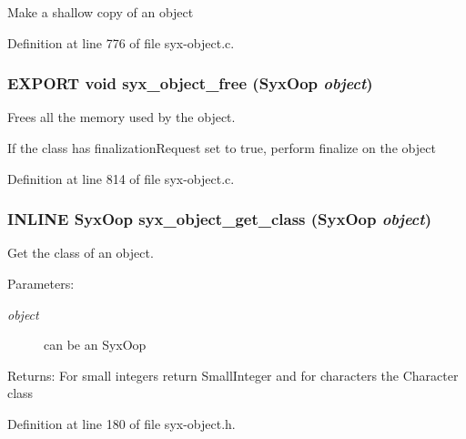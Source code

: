 Make a shallow copy of an object 

Definition at line 776 of file syx-object.c.\hypertarget{syx-object_8h_1183dd2393eabdaf754948e182dcb287}{
\subsubsection{\setlength{\rightskip}{0pt plus 5cm}EXPORT void syx\_\-object\_\-free ({\bf SyxOop} {\em object})}}
\label{syx-object_8h_1183dd2393eabdaf754948e182dcb287}


Frees all the memory used by the object.

If the class has finalizationRequest set to true, perform finalize on the object 

Definition at line 814 of file syx-object.c.\hypertarget{syx-object_8h_88d1e4f8e61fb948d275e3900cec21fe}{
\subsubsection{\setlength{\rightskip}{0pt plus 5cm}INLINE {\bf SyxOop} syx\_\-object\_\-get\_\-class ({\bf SyxOop} {\em object})}}
\label{syx-object_8h_88d1e4f8e61fb948d275e3900cec21fe}


Get the class of an object.

\begin{Desc}
\item[Parameters:]
\begin{description}
\item[{\em object}]can be an SyxOop \end{description}
\end{Desc}
\begin{Desc}
\item[Returns:]For small integers return SmallInteger and for characters the Character class \end{Desc}


Definition at line 180 of file syx-object.h.

